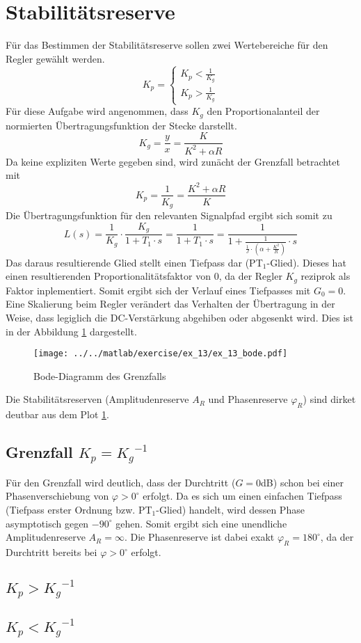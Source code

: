 \section{Stabilitätsreserve}
Für das Bestimmen der Stabilitätsreserve sollen zwei Wertebereiche für den
Regler gewählt werden.
\[
	K_p  = \left\{
		\begin{array}{l}
			K_p < \frac{1}{K_g} \\
			K_p > \frac{1}{K_g}
		\end{array}
	\right.
\]
Für diese Aufgabe wird angenommen, dass $K_g$ den Proportionalanteil
der normierten Übertragungsfunktion der Stecke darstellt.
\[
	K_g = \frac{y}{x} = \frac{K}{K^2 + \alpha R}
\]
Da keine expliziten Werte gegeben sind, wird zunächt der Grenzfall
betrachtet mit
\[
	K_p = \frac{1}{K_g} = \frac{K^2 + \alpha R}{K}
\]
Die Übertragungsfunktion für den relevanten Signalpfad ergibt sich somit zu
\[
	L(s) = \frac{1}{K_g} \cdot \frac{K_g}{1 + T_1 \cdot s}
	= \frac{1}{1 + T_1 \cdot s} 
	= \frac{1}{1 + \frac{1}{\frac{1}{J} \cdot \left(
		\alpha + \frac{K^2}{R} \right) } \cdot s }
\]
Das daraus resultierende Glied stellt einen Tiefpass dar (PT$_1$-Glied).
Dieses hat einen resultierenden Proportionalitätsfaktor von 0, da der 
Regler $K_g$ reziprok als Faktor inplementiert. Somit ergibt sich der
Verlauf eines Tiefpasses mit $G_0 = 0$. Eine Skalierung beim Regler
verändert das Verhalten der Übertragung in der Weise, dass legiglich die
DC-Verstärkung abgehiben oder abgesenkt wird. Dies ist in der Abbildung
\ref{fig:ex_13_bode} dargestellt.
\begin{figure}[h!]
	\centering
	\texttt{[image: ../../matlab/exercise/ex\_13/ex\_13\_bode.pdf]}
	\caption{Bode-Diagramm des Grenzfalls}
	\label{fig:ex_13_bode}
\end{figure}
Die Stabilitätsreserven (Amplitudenreserve $A_R$ und Phasenreserve
$\varphi_R$) sind dirket deutbar aus dem Plot \ref{fig:ex_13_bode}.

\subsection{Grenzfall $K_p = {K_g}^{-1}$}
Für den Grenzfall wird deutlich, dass der Durchtritt ($G = 0$dB) schon
bei einer Phasenverschiebung von $\varphi > 0^{\circ}$ erfolgt.
Da es sich um einen einfachen Tiefpass (Tiefpass erster Ordnung bzw.
PT$_1$-Glied) handelt, wird dessen Phase
asymptotisch gegen $-90^{\circ}$ gehen. Somit ergibt sich eine unendliche
Amplitudenreserve $A_R = \infty$. Die Phasenreserve ist dabei exakt
$\varphi_R = 180^{\circ}$, da der Durchtritt bereits bei
$\varphi > 0^{\circ}$ erfolgt.

\subsection{$K_p > {K_g}^{-1}$}


\subsection{$K_p < {K_g}^{-1}$}
